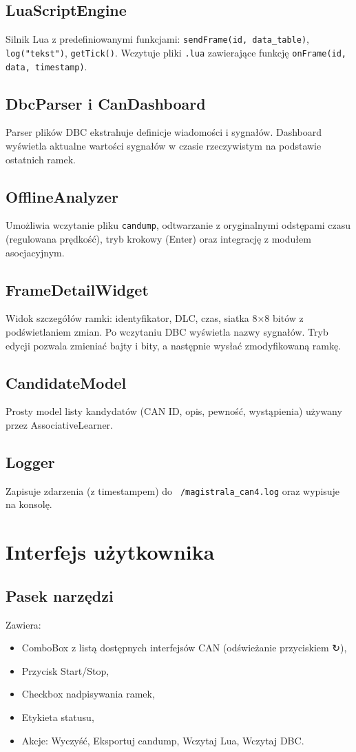 \documentclass[a4paper,12pt,polish]{article}
\begin{document}
\subsection{LuaScriptEngine}
Silnik Lua z predefiniowanymi funkcjami: \texttt{sendFrame(id, data\_table)}, \texttt{log("tekst")}, \texttt{getTick()}. Wczytuje pliki \texttt{.lua} zawierające funkcję \texttt{onFrame(id, data, timestamp)}.

\subsection{DbcParser i CanDashboard}
Parser plików DBC ekstrahuje definicje wiadomości i sygnałów. Dashboard wyświetla aktualne wartości sygnałów w czasie rzeczywistym na podstawie ostatnich ramek.

\subsection{OfflineAnalyzer}
Umożliwia wczytanie pliku \texttt{candump}, odtwarzanie z oryginalnymi odstępami czasu (regulowana prędkość), tryb krokowy (Enter) oraz integrację z modułem asocjacyjnym.

\subsection{FrameDetailWidget}
Widok szczegółów ramki: identyfikator, DLC, czas, siatka 8×8 bitów z podświetlaniem zmian. Po wczytaniu DBC wyświetla nazwy sygnałów. Tryb edycji pozwala zmieniać bajty i bity, a następnie wysłać zmodyfikowaną ramkę.

\subsection{CandidateModel}
Prosty model listy kandydatów (CAN ID, opis, pewność, wystąpienia) używany przez AssociativeLearner.

\subsection{Logger}
Zapisuje zdarzenia (z timestampem) do \texttt{~/magistrala\_can4.log} oraz wypisuje na konsolę.

\section{Interfejs użytkownika}
\label{sec:gui}

\subsection{Pasek narzędzi}
Zawiera:
\begin{itemize}[noitemsep]
  \item ComboBox z listą dostępnych interfejsów CAN (odświeżanie przyciskiem ↻),
  \item Przycisk Start/Stop,
  \item Checkbox nadpisywania ramek,
  \item Etykieta statusu,
  \item Akcje: Wyczyść, Eksportuj candump, Wczytaj Lua, Wczytaj DBC.
\end{itemize}
\end{document}
